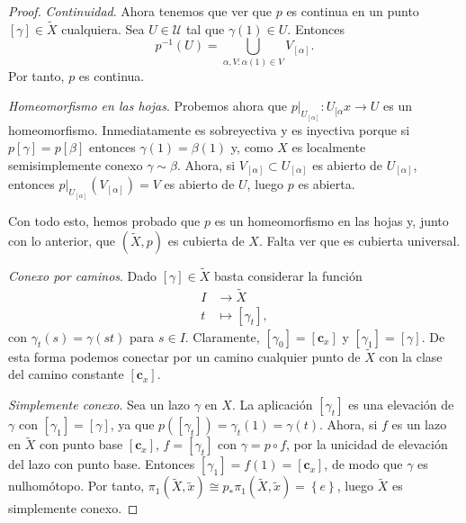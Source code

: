 \documentclass[12pt,a4paper]{book}
\theoremstyle{definition} \newtheorem{defn}[thm]{Definición}
\theoremstyle{definition} \newtheorem{ejemplo}[thm]{Ejemplo}
\theoremstyle{definition} \newtheorem{ejercicio}[thm]{Ejercicio}
\theoremstyle{remark} \newtheorem*{obs}{Observación}
\def\cc{\mathbf{c}}
\def\gf{\pi_1}
\def\XX{\tilde{X}}
\def\xx{\tilde{x}}
\begin{document}
\begin{proof}
    \textit{Continuidad}. Ahora tenemos que ver que $p$ es continua en un punto $[\gamma]\in\XX$ cualquiera. Sea $U\in \mathcal{U}$ tal que $\gamma(1)\in U$. Entonces
    \begin{equation*}
      p^{-1}(U)=\bigcup_{\alpha, V:\alpha(1)\in V} V_{[\alpha]}.
    \end{equation*}
    Por tanto, $p$ es continua.

    \textit{Homeomorfismo en las hojas}. Probemos ahora que $p|_{U_{[\alpha]}}:U_{[\alpha}x\rightarrow U$ es un homeomorfismo. Inmediatamente es sobreyectiva y es inyectiva porque si $p[\gamma]=p[\beta]$ entonces $\gamma(1)=\beta(1)$ y, como $X$ es localmente semisimplemente conexo $\gamma\sim \beta$. Ahora, si $V_{[\alpha]}\subset U_{[\alpha]}$ es abierto de $U_{[\alpha]}$, entonces $p|_{U_{[\alpha]}}(V_{[\alpha]})=V$ es abierto de $U$, luego $p$ es abierta.
    
    Con todo esto, hemos probado que $p$ es un homeomorfismo en las hojas y, junto con lo anterior, que $(\XX,p)$ es cubierta de $X$. Falta ver que es cubierta universal.
    
    \textit{Conexo por caminos}. Dado $[\gamma]\in \XX$ basta considerar la función
    \begin{align*}
      I&\longrightarrow \XX\\ 
      t &\longmapsto [\gamma_t], 
      \end{align*}
    con $\gamma_t(s)=\gamma(st)$ para $s\in I$. Claramente, $[\gamma_0]=[\cc_x]$ y $[\gamma_1]=[\gamma]$. De esta forma podemos conectar por un camino cualquier punto de $\XX$ con la clase del camino constante $[\cc_x]$.

    \textit{Simplemente conexo}. Sea un lazo $\gamma$ en $X$. La aplicación $[\gamma_t]$ es una elevación de $\gamma$ con $[\gamma_1]=[\gamma]$, ya que $p([\gamma_t])=\gamma_t(1)=\gamma(t)$. Ahora, si $f$ es un lazo en $\XX$ con punto base $[\cc_x]$, $f=[\gamma_t]$ con $\gamma=p\circ f$, por la unicidad de elevación del lazo con punto base. Entonces $[\gamma_1]=f(1)=[\cc_x]$, de modo que $\gamma$ es nulhomótopo. Por tanto, $\gf(\XX,\xx)\cong p_*\gf(\XX,\xx)=\left\{ e \right\}$, luego $\XX$ es simplemente conexo.  
\end{proof}
\end{document}
